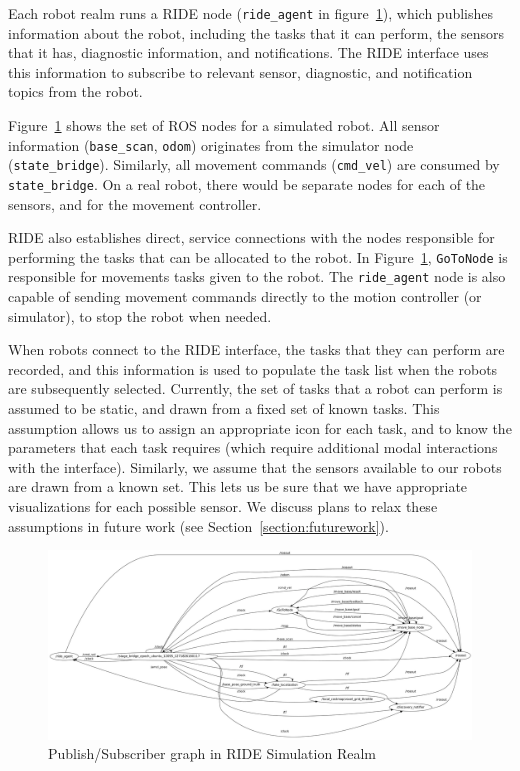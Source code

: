Each robot realm runs a RIDE node (\verb!ride_agent! in figure~\ref{fig:ride-simulation-realm}), which publishes information about the robot, including the tasks that it can perform, the sensors that it has, diagnostic information, and notifications. The RIDE interface uses this information to subscribe to relevant sensor, diagnostic, and notification topics from the robot.

Figure~\ref{fig:ride-simulation-realm} shows the set of ROS nodes for a simulated robot. All sensor information (\verb!base_scan!, \verb!odom!) originates from the simulator node (\verb!state_bridge!). Similarly, all movement commands (\verb!cmd_vel!) are consumed by \verb!state_bridge!. On a real robot, there would be separate nodes for each of the sensors, and for the movement controller.

RIDE also establishes direct, service connections with the nodes responsible for performing the tasks that can be allocated to the robot. In Figure~\ref{fig:ride-simulation-realm}, \verb!GoToNode! is responsible for movements tasks given to the robot. The \verb!ride_agent! node is also capable of sending movement commands directly to the motion controller (or simulator), to stop the robot when needed.

When robots connect to the RIDE interface, the tasks that they can perform are recorded, and this information is used to populate the task list when the robots are subsequently selected. Currently, the set of tasks that a robot can perform is assumed to be static, and drawn from a fixed set of known tasks. This assumption allows us to assign an appropriate icon for each task, and to know the parameters that each task requires (which require additional modal interactions with the interface). Similarly, we assume that the sensors available to our robots are drawn from a known set. This lets us be sure that we have appropriate visualizations for each possible sensor. We discuss plans to relax these assumptions in future work (see Section~\ref{section:futurework}).

\begin{figure}
\includegraphics[width=\textwidth]{images/ride-simulation-realm.png}
\caption{Publish/Subscriber graph in RIDE Simulation Realm\label{fig:ride-simulation-realm}}
\end{figure}


